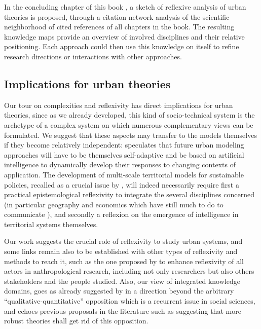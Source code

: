 In the concluding chapter of this book \cite{pumain2019perspectives}, a sketch of reflexive analysis of urban theories is proposed, through a citation network analysis of the scientific neighborhood of cited references of all chapters in the book. The resulting knowledge maps provide an overview of involved disciplines and their relative positioning. Each approach could then use this knowledge on itself to refine research directions or interactions with other approaches.



\subsection{Implications for urban theories}


Our tour on complexities and reflexivity has direct implications for urban theories, since as we already developed, this kind of socio-technical system is the archetype of a complex system on which numerous complementary views can be formulated. We suggest that these aspects may transfer to the models themselves if they become relatively independent: \cite{white2017necessity} speculates that future urban modeling approaches will have to be themselves self-adaptive and be based on artificial intelligence to dynamically develop their responses to changing contexts of application. The development of multi-scale territorial models for sustainable policies, recalled as a crucial issue by \cite{rozenblat2018conclusion}, will indeed necessarily require first a practical epistemological reflexivity to integrate the several disciplines concerned (in particular geography and economics which have still much to do to communicate \cite{raimbault2017invisible}), and secondly a reflexion on the emergence of intelligence in territorial systems themselves.

Our work suggests the crucial role of reflexivity to study urban systems, and some links remain also to be established with other types of reflexivity and methods to reach it, such as the one proposed by \cite{anzoise2017perception} to enhance reflexivity of all actors in anthropological research, including not only researchers but also others stakeholders and the people studied. Also, our view of integrated knowledge domains, goes as already suggested by \cite{raimbault2017cadre} in a direction beyond the arbitrary ``qualitative-quantitative'' opposition which is a recurrent issue in social sciences, and echoes previous proposals in the literature such as \cite{shah2006building} suggesting that more robust theories shall get rid of this opposition.

